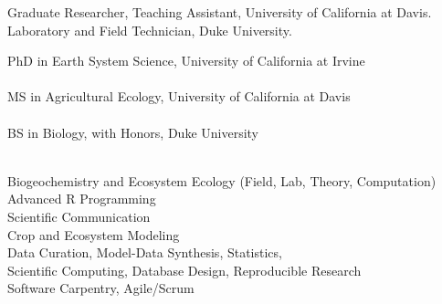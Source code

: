 \documentclass{xetexCV}
\begin{document}
Graduate Researcher, Teaching Assistant, University of California at Davis. \\


Laboratory and Field Technician, Duke University. \\


 PhD in Earth System Science, University of California at Irvine\\  \\ %
 MS in Agricultural Ecology, University of California at Davis 
\\ \\%
 BS in Biology, with Honors,  Duke University \\ \\%



Biogeochemistry and Ecosystem Ecology (Field, Lab, Theory, Computation)\\
Advanced R Programming\\
Scientific Communication\\
Crop and Ecosystem Modeling\\ Data Curation, Model-Data Synthesis, Statistics, \\ Scientific Computing, Database Design, Reproducible Research\\Software Carpentry, Agile/Scrum
\end{document}
